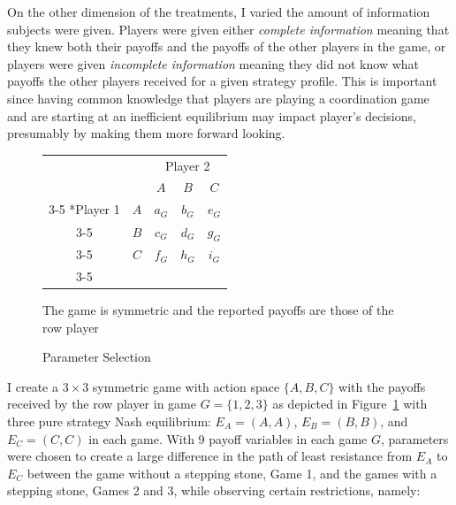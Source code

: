 On the other dimension of the treatments, I varied the amount of information subjects were given. Players were given either \textit{complete information} meaning that they knew both their payoffs and the payoffs of the other players in the game, or players were given \textit{incomplete information} meaning they did not know what payoffs the other players received for a given strategy profile. This is important since having common knowledge that players are playing a coordination game and are starting at an inefficient equilibrium may impact player’s decisions, presumably by making them more forward looking.

\begin{figure}[h]
\captionsetup{justification=centering}
  \caption{Parameter Selection}
   \label{fig:Parameters}
   \centering
\vskip6pt
\begin{tabular}{cc|c|c|c|}
      & \multicolumn{1}{c}{} & \multicolumn{3}{c}{Player 2}\\
      & \multicolumn{1}{c}{} & \multicolumn{1}{c}{$A$}  & \multicolumn{1}{c}{$B$} & \multicolumn{1}{c}{$C$} \\\cline{3-5}
      \multirow{2}*{Player 1}  & $A$ & $a_G$ & $b_G$ & $e_G$ \\\cline{3-5}
      & $B$ & $c_G$ & $d_G$ & $g_G$ \\\cline{3-5}
      & $C$ & $f_G$ & $h_G$ & $i_G$ \\\cline{3-5}
    \end{tabular}
        \vskip12pt\small
The game is symmetric and the reported payoffs are those of the row player
\end{figure}

I create a $3 \times 3$ symmetric game with action space $\{A, B, C\}$ with the payoffs received by the row player in game $G = \{1, 2, 3\}$ as depicted in Figure~\ref{fig:Parameters} with three pure strategy Nash equilibrium: $E_A = (A, A)$, $E_B = (B, B)$, and $E_C = (C, C)$ in each game. With 9 payoff variables in each game $G$, parameters were chosen to create a large difference in the path of least resistance from $E_A$ to $E_C$ between the game without a stepping stone, Game 1, and the games with a stepping stone, Games 2 and 3, while observing certain restrictions, namely: 

